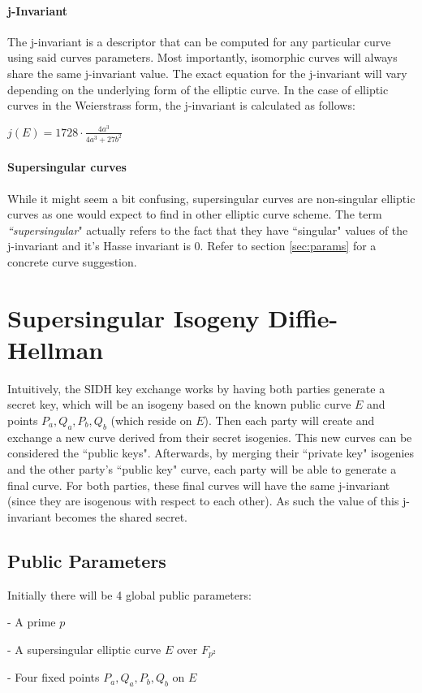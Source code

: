\documentclass[10pt,twocolumn]{article} %
\begin{document}
\paragraph{j-Invariant}
The j-invariant is a descriptor that can be computed for any particular curve using said curves parameters. Most importantly, isomorphic curves will always share the same j-invariant value. The exact equation for the j-invariant will vary depending on the underlying form of the elliptic curve. In the case of elliptic curves in the Weierstrass form, the j-invariant is calculated as follows:

\begin{center}
	\centering
	$j(E)=1728\cdot\frac{4a^3}{4a^3+27b^2}$
\end{center}


\paragraph{Supersingular curves} While it might seem a bit confusing, supersingular curves are non-singular elliptic curves as one would expect to find in other elliptic curve scheme. The term \textit{``supersingular}" actually refers to the fact that they have ``singular" values of the j-invariant and it's Hasse invariant is 0. Refer to section \ref{sec:params} for a concrete curve suggestion.

\section{Supersingular Isogeny Diffie-Hellman}
Intuitively, the SIDH key exchange works by having both parties generate a secret key, which will be an isogeny based on the known public curve $E$ and points $P_a,Q_a,P_b,Q_b$ (which reside on $E$). Then each party will create and exchange a new curve derived from their secret isogenies. This new curves can be considered the ``public keys". Afterwards, by merging their ``private key" isogenies and the other party's ``public key" curve, each party will be able to generate a final curve. For both parties, these final curves will have the same j-invariant (since they are isogenous with respect to each other). As such the value of this j-invariant becomes the shared secret.

\subsection{Public Parameters}
Initially there will be 4 global public parameters:
\par - A prime $p$ 
\par - A supersingular elliptic curve $E$ over $F_{p^2}$
\par - Four fixed points $P_a,Q_a,P_b,Q_b$ on $E$ 
\end{document}
